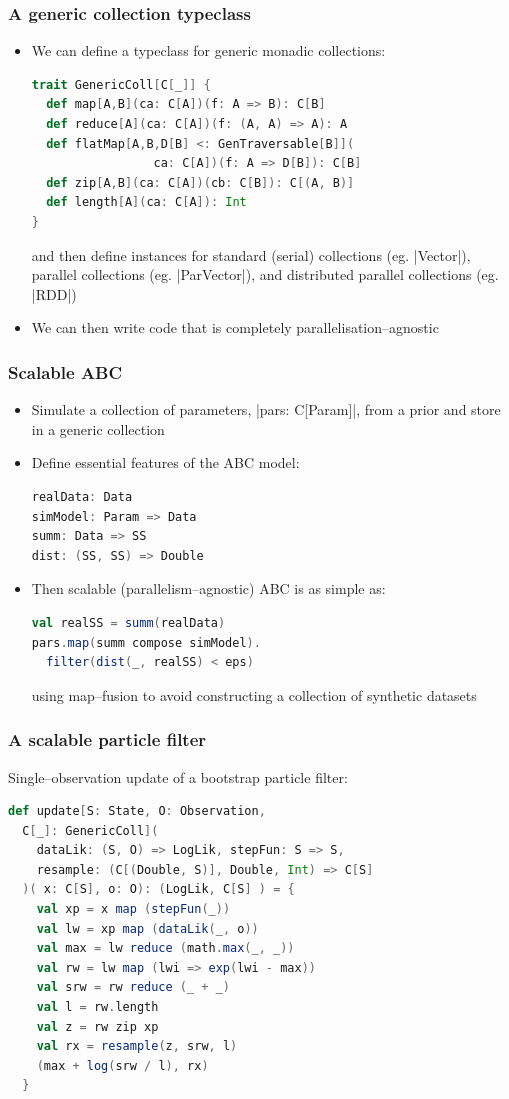 \documentclass[mathserif,handout]{beamer}
\begin{document}
\begin{frame}[fragile]
  \frametitle{A generic collection typeclass}
  \begin{itemize}
  \item We can define a typeclass for generic monadic collections:
\begin{lstlisting}[language=scala]
trait GenericColl[C[_]] {
  def map[A,B](ca: C[A])(f: A => B): C[B]
  def reduce[A](ca: C[A])(f: (A, A) => A): A
  def flatMap[A,B,D[B] <: GenTraversable[B]](
                 ca: C[A])(f: A => D[B]): C[B]
  def zip[A,B](ca: C[A])(cb: C[B]): C[(A, B)]
  def length[A](ca: C[A]): Int
}
\end{lstlisting}
and then define instances for standard (serial) collections (eg. |Vector|), parallel collections (eg. |ParVector|), and distributed parallel collections (eg. |RDD|)
\item We can then write code that is completely \alert{parallelisation--agnostic}
  \end{itemize}
\end{frame}

\begin{frame}[fragile]
\frametitle{Scalable ABC}
\begin{itemize}
\item Simulate a collection of parameters, |pars: C[Param]|, from a prior and store in a generic collection
\item Define essential features of the ABC model:
\begin{lstlisting}[language=scala]
realData: Data    
simModel: Param => Data
summ: Data => SS
dist: (SS, SS) => Double
\end{lstlisting}
\item Then scalable (parallelism--agnostic) ABC is as simple as:
\begin{lstlisting}[language=scala]
val realSS = summ(realData)
pars.map(summ compose simModel).
  filter(dist(_, realSS) < eps)
\end{lstlisting}
using map--fusion to avoid constructing a collection of synthetic datasets
\end{itemize}
\end{frame}


\begin{frame}[fragile]
  \frametitle{A scalable particle filter}
Single--observation update of a bootstrap particle filter:
\begin{lstlisting}[language=scala]
def update[S: State, O: Observation,
  C[_]: GenericColl](
    dataLik: (S, O) => LogLik, stepFun: S => S,
    resample: (C[(Double, S)], Double, Int) => C[S]
  )( x: C[S], o: O): (LogLik, C[S] ) = {
    val xp = x map (stepFun(_))
    val lw = xp map (dataLik(_, o))
    val max = lw reduce (math.max(_, _))
    val rw = lw map (lwi => exp(lwi - max))
    val srw = rw reduce (_ + _)
    val l = rw.length
    val z = rw zip xp
    val rx = resample(z, srw, l)
    (max + log(srw / l), rx)
  }
\end{lstlisting}
\end{frame}
\end{document}

